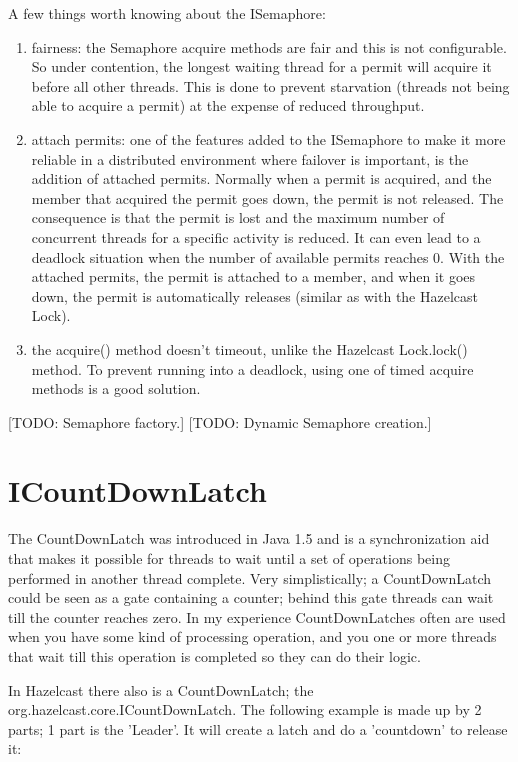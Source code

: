 A few things worth knowing about the ISemaphore:
\begin{enumerate}
\item fairness: the Semaphore acquire methods are fair and this is not configurable. So under contention, the longest waiting thread for a permit will acquire it before all other threads. This is done to prevent starvation (threads not being able to acquire a permit) at the expense of reduced throughput.
\item attach permits: one of the features added to the ISemaphore to make it more reliable in a distributed environment where failover is important, is the addition of attached permits. Normally when a permit is acquired, and the member that acquired the permit goes down, the permit is not released. The consequence is that the permit is lost and the maximum number of concurrent threads for a specific activity is reduced. It can even lead to a deadlock situation when the number of available permits reaches 0. With the attached permits, the permit is attached to a member, and when it goes down, the permit is automatically releases (similar as with the Hazelcast Lock).
\item the acquire() method doesn't timeout, unlike the Hazelcast Lock.lock() method. To prevent running into a deadlock, using one of timed acquire methods is a good solution.
\end{enumerate}

[TODO: Semaphore factory.]
[TODO: Dynamic Semaphore creation.]

\section{ICountDownLatch}
The CountDownLatch was introduced in Java 1.5 and is a synchronization aid that makes it possible for threads to wait until a set of operations being performed in another thread  complete. Very simplistically; a CountDownLatch could be seen as a gate containing a counter; behind this gate threads can wait till the counter reaches zero. In my experience CountDownLatches often are used when you have some kind of processing operation, and you one or more threads that wait till this operation is completed so they can do their logic.

In Hazelcast there also is a CountDownLatch; the org.hazelcast.core.ICountDownLatch. The following example is made up by 2 parts; 1 part is the 'Leader'. It will create a latch and do a 'countdown' to release it:

